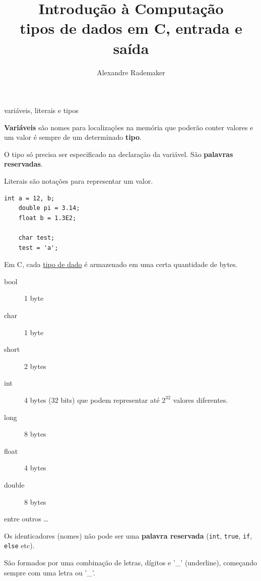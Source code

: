\documentclass{beamer}
\title{Introdução à Computação \\ tipos de dados em C, entrada e saída}
\author{Alexandre Rademaker}
\date{}
\begin{document}
\begin{frame}
 \maketitle
\end{frame}

\begin{frame}{variáveis, literais e tipos}

  \textbf{Variáveis} são nomes para localizações na memória que
  poderão conter valores e um valor é sempre de um determinado
  \textbf{tipo}.

  O tipo só precisa ser especificado na declaração da variável. São
  \textbf{palavras reservadas}.

  Literais são notações para representar um valor.\vspace{.5cm}

  \begin{lstlisting}[style=normalc]
    int a = 12, b;
    double pi = 3.14;
    float b = 1.3E2;

    char test;
    test = 'a';
  \end{lstlisting}

  \framebreak
  
  Em C, cada \href{https://en.wikipedia.org/wiki/C_data_types}{tipo de
    dado} é armazenado em uma certa quantidade de bytes.

  \begin{description}
  \item[bool] 1 byte
  \item[char] 1 byte
  \item[short] 2 bytes
  \item[int] 4 bytes (32 bits) que podem representar até $2^{32}$
    valores diferentes.
  \item[long] 8 bytes    
  \item[float] 4 bytes
  \item[double] 8 bytes    
  \end{description}

  entre outros \ldots

  \framebreak

  Os identicadores (nomes) não pode ser uma \textbf{palavra reservada}
  (\texttt{int}, \texttt{true}, \texttt{if}, \texttt{else} etc).

  São formados por uma combinação de letras, dígitos e '\_'
  (underline), começando sempre com uma letra ou '\_'.
  

\end{frame}
\end{document}
